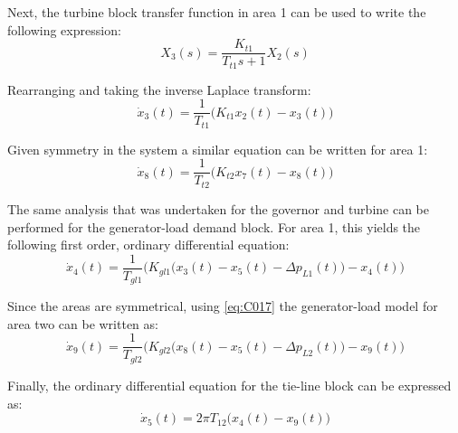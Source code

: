 Next, the turbine block transfer function in area 1 can be used to write the following expression:
\begin{equation}
	X_3(s) = \frac{K_{t1}}{T_{t1}s + 1} X_2(s) \label{eq:C014}
\end{equation}

Rearranging and taking the inverse Laplace transform:
\begin{equation}
	\dot{x}_3(t) = \frac{1}{T_{t1}} \big( K_{t1} x_2(t) - x_3(t) \big) \label{eq:C015}
\end{equation}

Given symmetry in the system a similar equation can be written for area 1:
\begin{equation}
	\dot{x}_8(t) = \frac{1}{T_{t2}} \big( K_{t2} x_7(t) - x_8(t) \big) \label{eq:C016}
\end{equation}

The same analysis that was undertaken for the governor and turbine can be performed for the generator-load demand block. For area 1, this yields the following first order, ordinary differential equation:
\begin{equation}
	\dot{x}_4(t) = \frac{1}{T_{gl1}} \bigg( K_{gl1} \big( x_3(t) - x_5(t) - \Delta p_{L1}(t) \big) - x_4(t) \bigg) \label{eq:C017}
\end{equation}

Since the areas are symmetrical, using \ref{eq:C017} the generator-load model for area two can be written as:
\begin{equation}
	\dot{x}_9(t) = \frac{1}{T_{gl2}} \bigg( K_{gl2} \big( x_8(t) - x_5(t) - \Delta p_{L2}(t) \big) - x_9(t) \bigg) \label{eq:C018}
\end{equation}

Finally, the ordinary differential equation for the tie-line block can be expressed as:
\begin{equation}
	\dot{x}_5(t) = 2 \pi T_{12} \big( x_4(t) - x_9(t) \big)
\end{equation}